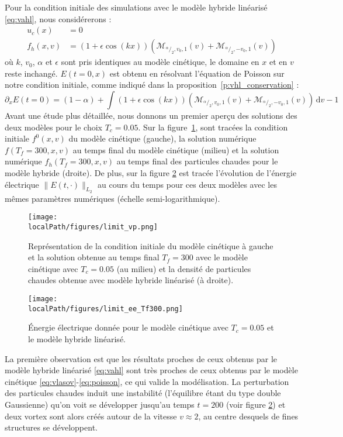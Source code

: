 Pour la condition initiale des simulations avec le modèle hybride linéarisé \eqref{eq:vahl}, nous considérerons :
\begin{equation}
  \begin{aligned}
    u_c(x)   & = 0 \\
    f_h(x,v) & = (1+\epsilon\cos(kx))\left( \mathcal{M}_{^\alpha/_2,v_0,1}(v) + \mathcal{M}_{^\alpha/_2,-v_0,1}(v) \right)
  \end{aligned}
\label{eq:HL:init}
\end{equation}
où $k$, $v_0$, $\alpha$ et $\epsilon$ sont pris identiques au modèle cinétique, le domaine en $x$ et en $v$ reste inchangé. $E(t=0,x)$ est obtenu en résolvant l'équation de Poisson sur notre condition initiale, comme indiqué dans la proposition~\ref{p:vhl_conservation} :
$$
  \partial_x E(t=0) = (1-\alpha) + \int (1+\epsilon\cos(kx))\left( \mathcal{M}_{^\alpha/_2,v_0,1}(v) + \mathcal{M}_{^\alpha/_2,-v_0,1}(v) \right)\,\mathrm{d}v - 1
$$
Avant une étude plus détaillée, nous donnons un premier aperçu des solutions des deux modèles pour le choix $T_c=0.05$. 
Sur la figure~\ref{fig:limit_vp}, 
sont trac\'ees la condition initiale $f^0(x, v)$ du modèle cinétique (gauche), la solution numérique  $f(T_f=300, x, v)$ au temps final 
du modèle cinétique (milieu) et la solution num\'erique $f_h(T_f=300, x, v)$ au temps final des particules chaudes pour le modèle hybride (droite).  De plus, sur la figure \ref{fig:limit_ee_Tf300} est trac\'ee l'évolution de l'énergie électrique $\|E(t, \cdot)\|_{L_2}$ 
au cours du temps pour ces deux modèles avec les mêmes paramètres numériques (échelle semi-logarithmique). 
\begin{figure}[h]
  \centering
  \texttt{[image: \\localPath/figures/limit\_vp.png]}
  \caption{Représentation de la condition initiale du modèle cinétique à gauche et la solution obtenue au temps final $T_f=300$ avec le modèle cinétique avec $T_c = 0.05$ (au milieu) et la densité de particules chaudes obtenue avec modèle hybride linéarisé (à droite).}
  \label{fig:limit_vp}
\end{figure}
\begin{figure}[h]
  \centering
  \texttt{[image: \\localPath/figures/limit\_ee\_Tf300.png]}
  \caption{Énergie électrique donnée pour le modèle cinétique avec $T_c=0.05$ et le modèle hybride linéarisé.}
  \label{fig:limit_ee_Tf300}
\end{figure}
La premi\`ere observation est que les résultats proches de ceux obtenus par le modèle hybride linéarisé \eqref{eq:vahl}
sont tr\`es proches de ceux obtenus par le modèle cinétique \eqref{eq:vlasov}-\eqref{eq:poisson}, ce qui valide la mod\'elisation. 
La perturbation des particules chaudes induit une instabilit\'e (l'\'equilibre \'etant du type double Gaussienne) 
qu'on voit se d\'evelopper jusqu'au temps $t=200$ (voir figure \ref{fig:limit_ee_Tf300}) et deux vortex sont alors cr\'e\'es autour de la vitesse $v\approx 2$, au centre desquels de fines structures se d\'eveloppent. 

